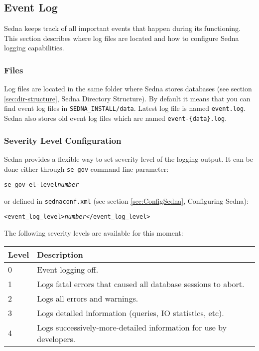 \documentclass[a4paper,12pt]{article}
\begin{document}
\subsection{Event Log}
\label{sec:event-log}
Sedna keeps track of all important events that happen during its functioning. This section describes where log files are located and how to configure Sedna logging capabilities.

\subsubsection{Files}
Log files are located in the same folder where Sedna stores databases (see section \ref{sec:dir-structure}, Sedna Directory Structure). By default it means that you can find event log files in \verb!SEDNA_INSTALL/data!.
Latest log file is named \verb!event.log!. Sedna also stores old event log files which are named \verb!event-{data}.log!.

\subsubsection{Severity Level Configuration}
Sedna provides a flexible way to set severity level of the logging output. It can be done either through \verb!se_gov! command line parameter:

\begin{alltt}
se_gov -el-level \emph{number}
\end{alltt}

or defined in \verb!sednaconf.xml! (see section \ref{sec:ConfigSedna}, Configuring Sedna):

\begin{alltt}
<event_log_level>\emph{number}</event_log_level>
\end{alltt}

The following severity levels are available for this moment:
\\
\begin{tabular}{|l|l|}
\hline
\hline
Level                & Description                                                        \\
\hline
\hline
0                    & Event logging off.                                                 \\
\hline
1                    & Logs fatal errors that caused all database sessions to abort.      \\
\hline
2                    & Logs all errors and warnings.                                      \\
\hline
3                    & Logs detailed information (queries, IO statistics, etc).           \\
\hline
4                    & Logs successively-more-detailed information for use by developers. \\
\hline
\end{tabular}
\end{document}

